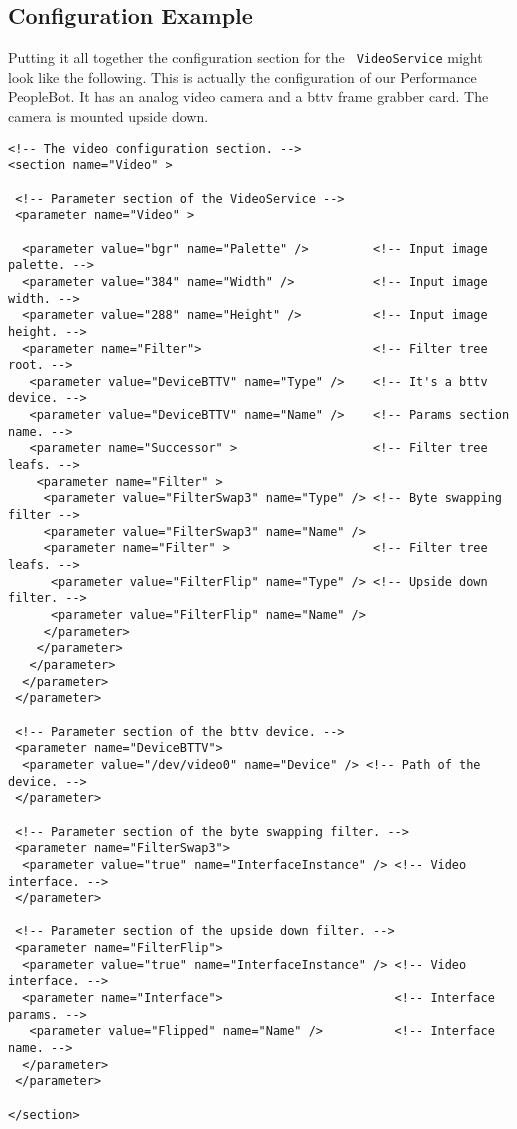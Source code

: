 \subsection{Configuration Example}

Putting it all together the configuration section for the {\tt
  VideoService} might look like the following. This is actually the
configuration of our Performance PeopleBot. It has an analog video
camera and a bttv frame grabber card. The camera is mounted upside
down.

\begin{verbatim}
<!-- The video configuration section. -->
<section name="Video" >

 <!-- Parameter section of the VideoService -->
 <parameter name="Video" >

  <parameter value="bgr" name="Palette" />         <!-- Input image palette. -->
  <parameter value="384" name="Width" />           <!-- Input image width. -->
  <parameter value="288" name="Height" />          <!-- Input image height. -->
  <parameter name="Filter">                        <!-- Filter tree root. -->
   <parameter value="DeviceBTTV" name="Type" />    <!-- It's a bttv device. -->
   <parameter value="DeviceBTTV" name="Name" />    <!-- Params section name. -->   
   <parameter name="Successor" >                   <!-- Filter tree leafs. -->
    <parameter name="Filter" >
     <parameter value="FilterSwap3" name="Type" /> <!-- Byte swapping filter -->
     <parameter value="FilterSwap3" name="Name" />
     <parameter name="Filter" >                    <!-- Filter tree leafs. -->
      <parameter value="FilterFlip" name="Type" /> <!-- Upside down filter. -->
      <parameter value="FilterFlip" name="Name" />
     </parameter> 
    </parameter>
   </parameter>
  </parameter>
 </parameter>

 <!-- Parameter section of the bttv device. -->
 <parameter name="DeviceBTTV">                   
  <parameter value="/dev/video0" name="Device" /> <!-- Path of the device. -->
 </parameter>

 <!-- Parameter section of the byte swapping filter. -->
 <parameter name="FilterSwap3">
  <parameter value="true" name="InterfaceInstance" /> <!-- Video interface. -->
 </parameter>

 <!-- Parameter section of the upside down filter. -->
 <parameter name="FilterFlip">
  <parameter value="true" name="InterfaceInstance" /> <!-- Video interface. -->
  <parameter name="Interface">                        <!-- Interface params. -->
   <parameter value="Flipped" name="Name" />          <!-- Interface name. -->
  </parameter>
 </parameter> 

</section>
\end{verbatim}

